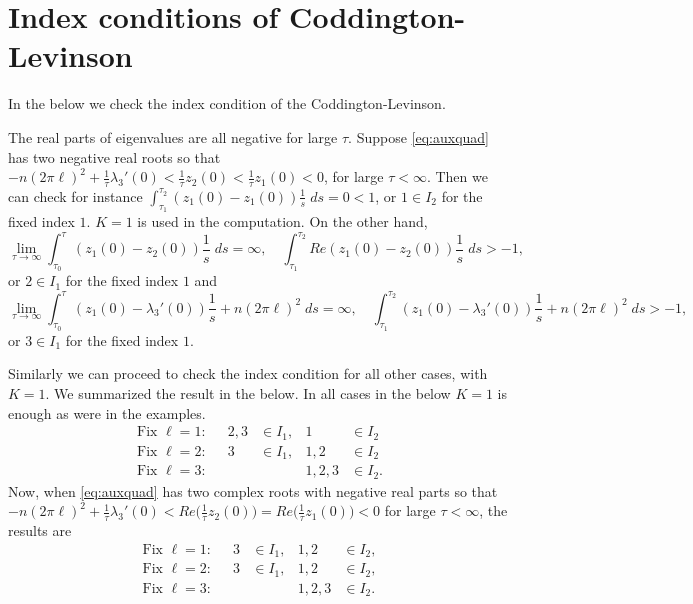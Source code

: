 \documentclass[a4paper,11pt]{article}
\def\l{(2\pi \ell)}
\theoremstyle{remark}
\begin{document}
\section{Index conditions of Coddington-Levinson} \label{sec:Index}

In the below we check the index condition of the Coddington-Levinson.

 The real parts of eigenvalues are all negative for large $\tau$. Suppose \eqref{eq:auxquad} has two negative real roots so that  $-n\l^2 + \frac{1}{\tau}\lambda_3'(0)<\frac{1}{\tau}z_2(0)<\frac{1}{\tau}z_1(0)<0$, for large $\tau<\infty$.  Then we can check for instance
$\displaystyle\int_{\tau_1}^{\tau_2} (z_1(0)-z_1(0))\frac{1}{s} \; ds = 0< 1$,
or $1\in I_2$ for the fixed index $1$. $K=1$ is used in the computation. On the other hand,
$$ \lim_{\tau \rightarrow \infty}\int_{\tau_0}^\tau (z_1(0)-z_2(0))\frac{1}{s} \; ds = \infty, \quad  \int_{\tau_1}^{\tau_2} Re (z_1(0)-z_2(0))\frac{1}{s} \; ds > -1,$$
or $2\in I_1$ for the fixed index $1$ and
$$ \lim_{\tau \rightarrow \infty}\int_{\tau_0}^\tau (z_1(0)-\lambda_3'(0))\frac{1}{s} + n\l^2 \; ds =\infty, \quad  \int_{\tau_1}^{\tau_2} (z_1(0)-\lambda_3'(0))\frac{1}{s} + n\l^2 \; ds > -1,$$
or $3\in I_1$ for the fixed index $1$.

 Similarly we can proceed to check the index condition for all other cases, with $K=1$.
We summarized the result in the below. In all cases in the below $K=1$ is enough as were in the examples.
\begin{align*}
  \text{Fix $\ell=1$:}&& 2,3&\in I_1, & 1&\in I_2\\
  \text{Fix $\ell=2$:}&& 3&\in I_1, & 1,2&\in I_2\\
  \text{Fix $\ell=3$:}&& & & 1,2,3&\in I_2.
\end{align*}
Now, when \eqref{eq:auxquad} has two complex roots with negative real parts so that $-n\l^2 + \frac{1}{\tau}\lambda_3'(0)<Re\Big(\frac{1}{\tau}z_2(0)\Big)=Re\Big(\frac{1}{\tau}z_1(0)\Big)<0$ for large $\tau<\infty$, the results are
\begin{align*}
  \text{Fix $\ell=1$:}&& 3&\in I_1, & 1,2&\in I_2,\\
  \text{Fix $\ell=2$:}&& 3&\in I_1, & 1,2&\in I_2,\\
  \text{Fix $\ell=3$:}&& & & 1,2,3&\in I_2.
\end{align*}
\end{document}
